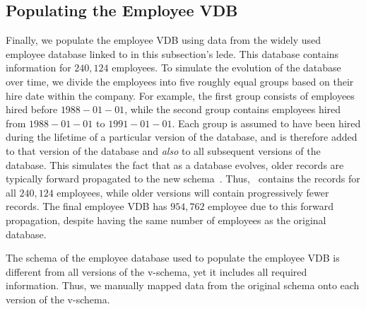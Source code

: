 \subsection{Populating the Employee VDB}
\label{sec:emp-pop}

Finally, we populate the employee VDB using data from the widely used employee
database linked to in this subsection's lede.
%
This database contains information for $240,124$ employees. To simulate the
evolution of the database over time, we divide the employees into five roughly
equal groups based on their hire date within the company. 
For example, the
first group consists of employees hired before $1988-01-01$, while the second
group contains employees hired from $1988-01-01$ to $1991-01-01$.
%
Each group is assumed to have been hired during the lifetime of a particular
version of the database, and is therefore added to that version of the database
and \emph{also} to all subsequent versions of the database. This simulates the
fact that as a database evolves, older records are typically forward propagated
to the new schema~\cite{schVersioningSurvey95Roddick}. Thus, \vFive\ contains
the records for all $240,124$ employees, while older versions will contain
progressively fewer records.
%
The final employee VDB has $954,762$ employee due to this forward propagation,
despite having the same number of employees as the original database.


The schema of the employee database used to populate the employee VDB
 is different from all versions of the
v-schema, yet it includes all required information. Thus,
we manually mapped data from the original schema onto each version of
the v-schema.

